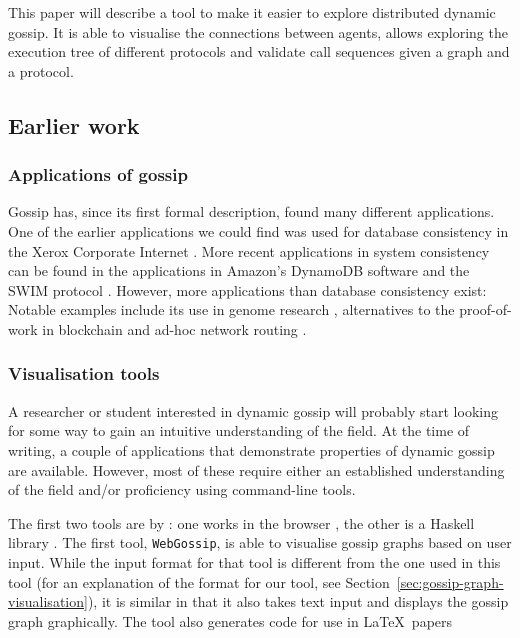 This paper will describe a tool to make it easier to explore distributed dynamic gossip.
It is able to visualise the connections between agents,
allows exploring the execution tree of different protocols and validate call sequences given a graph and a protocol.

\subsection{Earlier work}

\subsubsection{Applications of gossip}

Gossip has, since its first formal description, found many different applications.
One of the earlier applications we could find was used for database consistency in the Xerox Corporate Internet \parencite{demers_epidemic_1988}.
More recent applications in system consistency can be found in the applications in Amazon's DynamoDB software \parencite{decandia_dynamo_2007} and the SWIM protocol \parencite{das_swim_2002}.
However, more applications than database consistency exist:
Notable examples include its use in genome research \parencite{liben-nowell_gossip_2002},
alternatives to the proof-of-work in blockchain \parencite{renesse_blockchain_2016,baird_swirlds_2016} and ad-hoc network routing \parencite{haas_gossip-based_2006}.

\subsubsection{Visualisation tools}

A researcher or student interested in dynamic gossip will probably start looking for some way to gain an intuitive understanding of the field.
At the time of writing, a couple of applications that demonstrate properties of dynamic gossip are available.
However, most of these require either an established understanding of the field and/or proficiency using command-line tools.

The first two tools are by \textcite{gattinger_webgossip_2016, gattinger_m4lvingomoche_2020}: one works in the browser \parencite{gattinger_webgossip_2016}, the other is a Haskell library \parencite{gattinger_m4lvingomoche_2020}. 
The first tool, \texttt{WebGossip}, is able to visualise gossip graphs based on user input.
While the input format for that tool is different from the one used in this tool
(for an explanation of the format for our tool, see Section~\ref{sec:gossip-graph-visualisation}),
it is similar in that it also takes text input and displays the gossip graph graphically.
The tool also generates code for use in \LaTeX\ papers

